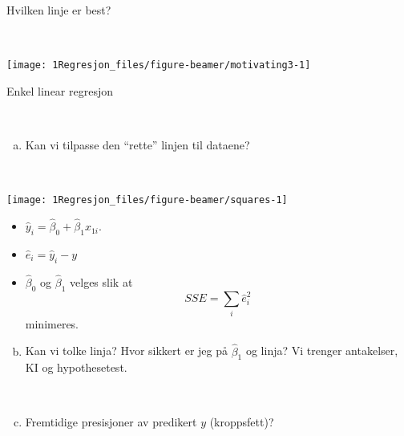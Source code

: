 \documentclass[10pt,ignorenonframetext,]{beamer}
\providecommand{\tightlist}{%
  \setlength{\itemsep}{0pt}\setlength{\parskip}{0pt}}
\begin{document}
\begin{frame}

Hvilken linje er best?

\(~\)

\begin{center}\texttt{[image: 1Regresjon\_files/figure-beamer/motivating3-1]} \end{center}

\end{frame}

\begin{frame}

\begin{block}{Enkel linear regresjon}

\(~\)

\begin{enumerate}
[a)]
\tightlist
\item
  Kan vi tilpasse den ``rette'' linjen til dataene?
\end{enumerate}

\(~\)

\begin{center}\texttt{[image: 1Regresjon\_files/figure-beamer/squares-1]} \end{center}

\begin{itemize}
\tightlist
\item
  \(\hat{y}_i = \hat\beta_0 + \hat\beta_1x_{1i}\).
\item
  \(\hat{e}_i = \hat{y}_i - y\)
\item
  \(\hat\beta_0\) og \(\hat\beta_1\) velges slik at
  \[SSE = \sum_i \hat{e}_i^2\] minimeres.
\end{itemize}

\end{block}

\end{frame}

\begin{frame}

\begin{enumerate}
[a)]
\setcounter{enumi}{1}
\tightlist
\item
  Kan vi tolke linja? Hvor sikkert er jeg på \(\hat\beta_1\) og linja?
  Vi trenger antakelser, KI og hypothesetest.
\end{enumerate}

\(~\)

\begin{enumerate}
[a)]
\setcounter{enumi}{2}
\tightlist
\item
  Fremtidige presisjoner av predikert \(y\) (kroppsfett)?
\end{enumerate}

\(~\)

\end{frame}
\end{document}
